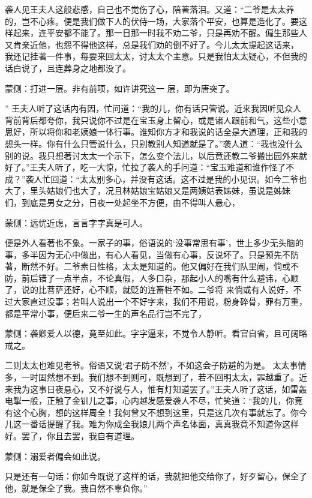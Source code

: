 \begin{parag}
    袭人见王夫人这般悲感，自己也不觉伤了心，陪著落泪。又道：“二爷是太太养的，岂不心疼。便是我们做下人的伏侍一场，大家落个平安，也算是造化了。要这样起来，连平安都不能了。那一日那一时我不劝二爷，只是再劝不醒。偏生那些人又肯亲近他，也怨不得他这样，总是我们劝的倒不好了。今儿太太提起这话来， 我还记挂著一件事，每要来回太太，讨太太个主意。只是我怕太太疑心，不但我的话白说了，且连葬身之地都没了。\begin{note}蒙侧：打进一层。非有前项，如许讲究这一 层，即为唐突了。\end{note}” 王夫人听了这话内有因，忙问道：“我的儿，你有话只管说。近来我因听见众人背前背后都夸你，我只说你不过是在宝玉身上留心，或是诸人跟前和气，这些小意思好，所以将你和老姨娘一体行事。谁知你方才和我说的话全是大道理，正和我的想头一样。你有什么只管说什么，只别教别人知道就是了。”袭人道：“我也没什么 别的说。我只想著讨太太一个示下，怎么变个法儿，以后竟还教二爷搬出园外来就好了。”王夫人听了，吃一大惊，忙拉了袭人的手问道：“宝玉难道和谁作怪了不成？”袭人忙回道：“太太别多心，并没有这话。这不过是我的小见识。如今二爷也大了，里头姑娘们也大了，况且林姑娘宝姑娘又是两姨姑表姊妹，虽说是姊妹 们，到底是男女之分，日夜一处起坐不方便，由不得叫人悬心，\begin{note}蒙侧：远忧近虑，言言字字真是可人。\end{note}便是外人看著也不象。一家子的事，俗语说的‘没事常思有事’，世上多少无头脑的事，多半因为无心中做出，有心人看见，当做有心事，反说坏了。只是预先不防著，断然不好。二爷素日性格，太太是知道的。他又偏好在我们队里闹，倘或不防，前后错了一点半点，不论真假，人多口杂，那起小人的嘴有什么避讳，心顺了，说的比菩萨还好，心不顺，就贬的连畜牲不如。二爷将 来倘或有人说好，不过大家直过没事；若叫人说出一个不好字来，我们不用说，粉身碎骨，罪有万重，都是平常小事，便后来二爷一生的声名品行岂不完了，\begin{note}蒙侧：袭卿爱人以德，竟至如此。字字逼来，不觉令人静听。看官自省，且可阔略戒之。\end{note}二则太太也难见老爷。俗语又说‘君子防不然’，不如这会子防避的为是。 太太事情多，一时固然想不到。我们想不到则可，既想到了，若不回明太太，罪越重了。近来我为这事日夜悬心，又不好说与人，惟有灯知道罢了。”王夫人听了这话，如雷轰电掣一般，正触了金钏儿之事，心内越发感爱袭人不尽，忙笑道：“我的儿，你竟有这个心胸，想的这样周全！我何曾又不想到这里，只是这几次有事就忘了。你今儿这一番话提醒了我。难为你成全我娘儿两个声名体面，真真我竟不知道你这样好。罢了，你且去罢，我自有道理。\begin{note}蒙侧：溺爱者偏会如此说。\end{note}只是还有一句话：你如今既说了这样的话，我就把他交给你了，好歹留心，保全了他，就是保全了我。我自然不辜负你。”
\end{parag}


